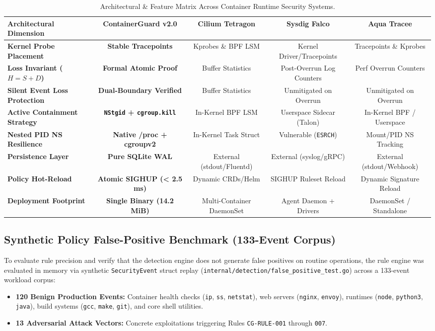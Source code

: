 \documentclass[11pt,a4paper]{article}
\begin{document}
\begin{table}[H]
\centering
\small
\begin{tabularx}{\textwidth}{l c c c c}
\toprule
\textbf{Architectural Dimension} & \textbf{ContainerGuard v2.0} & \textbf{Cilium Tetragon} & \textbf{Sysdig Falco} & \textbf{Aqua Tracee} \\
\midrule
\textbf{Kernel Probe Placement} & \textbf{Stable Tracepoints} & Kprobes \& BPF LSM & Kernel Driver/Tracepoints & Tracepoints \& Kprobes \\
\textbf{Loss Invariant ($H = S + D$)} & \textbf{Formal Atomic Proof} & Buffer Statistics & Post-Overrun Log Counters & Perf Overrun Counters \\
\textbf{Silent Event Loss Protection} & \textbf{Dual-Boundary Verified} & Buffer Statistics & Unmitigated on Overrun & Unmitigated on Overrun \\
\textbf{Active Containment Strategy} & \textbf{\texttt{NStgid} + \texttt{cgroup.kill}} & In-Kernel BPF LSM & Userspace Sidecar (Talon) & In-Kernel BPF / Userspace \\
\textbf{Nested PID NS Resilience} & \textbf{Native /proc + cgroupv2} & In-Kernel Task Struct & Vulnerable (\texttt{ESRCH}) & Mount/PID NS Tracking \\
\textbf{Persistence Layer} & \textbf{Pure SQLite WAL} & External (stdout/Fluentd) & External (syslog/gRPC) & External (stdout/Webhook) \\
\textbf{Policy Hot-Reload} & \textbf{Atomic SIGHUP (< 2.5 ms)} & Dynamic CRDs/Helm & SIGHUP Ruleset Reload & Dynamic Signature Reload \\
\textbf{Deployment Footprint} & \textbf{Single Binary (14.2 MiB)} & Multi-Container DaemonSet & Agent Daemon + Drivers & DaemonSet / Standalone \\
\bottomrule
\end{tabularx}
\caption{Architectural \& Feature Matrix Across Container Runtime Security Systems.}
\label{tab:comparative_benchmark}
\end{table}

\subsection{Synthetic Policy False-Positive Benchmark (133-Event Corpus)}
To evaluate rule precision and verify that the detection engine does not generate false positives on routine operations, the rule engine was evaluated in memory via synthetic \texttt{SecurityEvent} struct replay (\texttt{internal/detection/false\_positive\_test.go}) across a 133-event workload corpus:
\begin{itemize}
    \item \textbf{120 Benign Production Events:} Container health checks (\texttt{ip}, \texttt{ss}, \texttt{netstat}), web servers (\texttt{nginx}, \texttt{envoy}), runtimes (\texttt{node}, \texttt{python3}, \texttt{java}), build systems (\texttt{gcc}, \texttt{make}, \texttt{git}), and core shell utilities.
    \item \textbf{13 Adversarial Attack Vectors:} Concrete exploitations triggering Rules \texttt{CG-RULE-001} through \texttt{007}.
\end{itemize}
\end{document}
